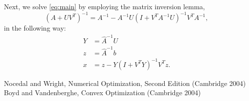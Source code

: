 \documentclass{article}
\begin{document}
Next, we solve \ref{eq:main} by employing the matrix inversion lemma,
    \begin{equation}
    (A+UV^T)^{-1} = A^{-1} - A^{-1}U(I + V^T A^{-1}U)^{-1} V^T A^{-1},
    \end{equation}
    in the following way:
\begin{align}
    Y &= \hat{A}^{-1} U \\
    z &= \hat{A}^{-1} b \\
    x &= z - Y (I + V^T Y)^{-1} V^T z.
\end{align}

    \begin{thebibliography}{99}
 Nocedal and Wright, 
    Numerical Optimization, Second Edition (Cambridge 2004)
 Boyd and Vandenberghe,
    Convex Optimization (Cambridge 2004)
\end{thebibliography}
\end{document}
